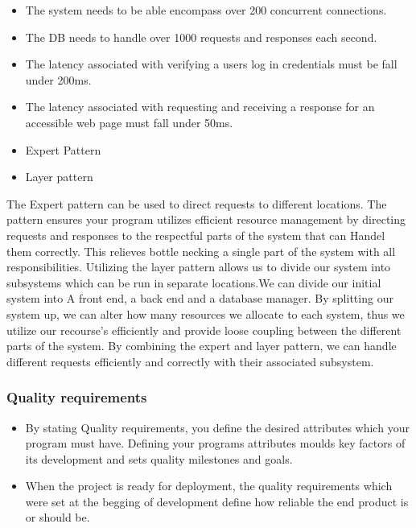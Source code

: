 \documentclass[a4paper,12pt]{article}
\begin{document}
    \begin{itemize}
        \item The system needs to be able encompass over 200 concurrent connections.
        
        \item The DB needs to handle over 1000 requests and responses each second.
        
        \item The latency associated with verifying a users log in credentials must be fall under 200ms. 
        
        \item The latency associated with requesting and receiving a response for an accessible web page must fall under 50ms.
    \end{itemize}
    \begin{itemize}
        \item Expert Pattern
        \item Layer pattern
    \end{itemize}
    
    \begin{flushleft}
    The Expert pattern can be used to direct requests to different locations. The pattern ensures your program utilizes efficient resource management by directing requests and responses to the respectful parts of the system that can Handel them correctly. This relieves bottle necking a single part of the system with all responsibilities.
    \linebreak
    Utilizing the layer pattern allows us to divide our system into subsystems which can be run in separate locations.We can divide our initial system into A front end, a back end and a database manager. By splitting our system up, we can alter how many resources we allocate to each system, thus we utilize our recourse's efficiently and provide loose coupling between the different parts of the system. 
    \linebreak
    By combining the expert and layer pattern, we can handle different requests efficiently and correctly with their associated subsystem. 
    \end{flushleft}

\subsubsection{Quality requirements}
    \begin{itemize}
        \item By stating Quality requirements, you define the desired attributes which your program must have. Defining your programs attributes moulds key factors of its development and sets quality milestones and goals.  
        
        \item When the project is ready for deployment, the quality requirements which were set at the begging of development define how reliable the end product is or should be.
    \end{itemize}
    
\end{document}
